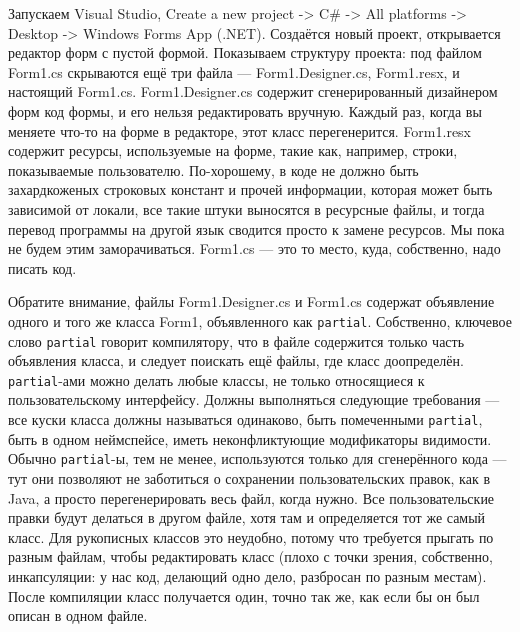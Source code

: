 \documentclass{../../text-style}
\begin{document}
Запускаем Visual Studio, Create a new project -> C\# -> All platforms -> Desktop -> Windows Forms App (.NET). Создаётся новый проект, открывается редактор форм с пустой формой. Показываем структуру проекта: под файлом Form1.cs скрываются ещё три файла --- Form1.Designer.cs, Form1.resx, и настоящий Form1.cs. Form1.Designer.cs содержит сгенерированный дизайнером форм код формы, и его нельзя редактировать вручную. Каждый раз, когда вы меняете что-то на форме в редакторе, этот класс перегенерится. Form1.resx содержит ресурсы, используемые на форме, такие как, например, строки, показываемые пользователю. По-хорошему, в коде не должно быть захардкоженых строковых констант и прочей информации, которая может быть зависимой от локали, все такие штуки выносятся в ресурсные файлы, и тогда перевод программы на другой язык сводится просто к замене ресурсов. Мы пока не будем этим заморачиваться. Form1.cs --- это то место, куда, собственно, надо писать код.

Обратите внимание, файлы Form1.Designer.cs и Form1.cs содержат объявление одного и того же класса Form1, объявленного как \texttt{partial}. Собственно, ключевое слово \texttt{partial} говорит компилятору, что в файле содержится только часть объявления класса, и следует поискать ещё файлы, где класс доопределён. \texttt{partial}-ами можно делать любые классы, не только относящиеся к пользовательскому интерфейсу. Должны выполняться следующие требования --- все куски класса должны называться одинаково, быть помеченными \texttt{partial}, быть в одном неймспейсе, иметь неконфликтующие модификаторы видимости. Обычно \texttt{partial}-ы, тем не менее, используются только для сгенерённого кода --- тут они позволяют не заботиться о сохранении пользовательских правок, как в Java, а просто перегенерировать весь файл, когда нужно. Все пользовательские правки будут делаться в другом файле, хотя там и определяется тот же самый класс. Для рукописных классов это неудобно, потому что требуется прыгать по разным файлам, чтобы редактировать класс (плохо с точки зрения, собственно, инкапсуляции: у нас код, делающий одно дело, разбросан по разным местам). После компиляции класс получается один, точно так же, как если бы он был описан в одном файле.
\end{document}

